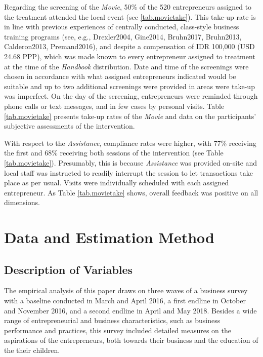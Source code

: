 \documentclass[11.5pt]{article}
\begin{document}
Regarding the screening of the \emph{Movie}, 50\% of the 520 entrepreneurs assigned to the treatment attended the local event (see \ref{tab.movietake}). This take-up rate is in line with previous experiences of centrally conducted, class-style business training programs (see, e.g., Drexler2004, Gine2014, Bruhn2017, Bruhn2013, Calderon2013, Premand2016), and despite a compensation of IDR 100,000 (USD 24.68 PPP), which was made known to every entrepreneur assigned to treatment at the time of the \emph{Handbook} distribution. Date and time of the screenings were chosen in accordance with what assigned entrepreneurs indicated would be suitable and up to two additional screenings were provided in areas were take-up was imperfect. On the day of the screening, entrepreneurs were reminded through phone calls or text messages, and in few cases by personal visits. Table \ref{tab.movietake} presents take-up rates of the \emph{Movie} and data on the participants' subjective assessments of the intervention.%

With respect to the \emph{Assistance}, compliance rates were higher, with 77\% receiving the first and 68\% receiving both sessions of the intervention (see Table \ref{tab.movietake}). Presumably, this is because \emph{Assistance} was provided on-site and local staff was instructed to readily interrupt the session to let transactions take place as per usual. Visits were individually scheduled with each assigned entrepreneur. As Table \ref{tab.movietake} shows, overall feedback was positive on all dimensions.

\section{Data and Estimation Method}\label{sec.data}

\subsection{Description of Variables}

The empirical analysis of this paper draws on three waves of a business survey with a baseline conducted in March and April 2016, a first endline in October and November 2016, and a second endline in April and May 2018. Besides a wide range of entrepreneurial and business characteristics, such as business performance and practices, this survey included detailed measures on the aspirations of the entrepreneurs, both towards their business and the education of the their children. %
\end{document}
